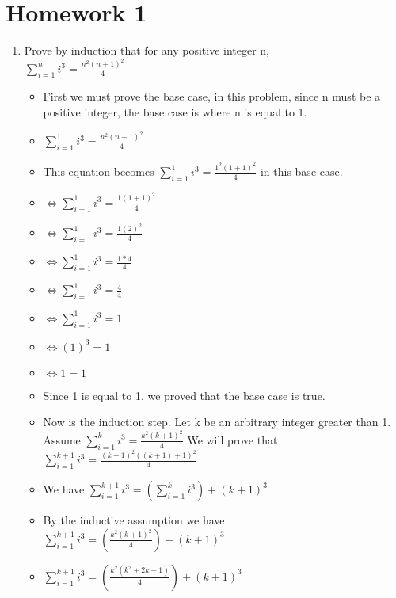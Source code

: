 
\section{Homework 1}
\begin{enumerate}
\item Prove by induction that for any positive integer n, \\
  {\Large $\sum\limits_{i=1}^{n}i^{3}=\frac{n^{2}(n+1)^{2}}{4}$}
    \begin{itemize}
    \item [] First we must prove the base case, in this problem, since n must be a positive integer, the base case is where n is equal to 1.
    \item [] {\Large $\sum\limits_{i=1}^{1}i^{3}=\frac{n^{2}(n+1)^{2}}{4}$}
    \item [] This equation becomes {\Large $\sum\limits_{i=1}^{1}i^{3}=\frac{1^{2}(1+1)^{2}}{4}$} in this base case.
    \item [] {\Large $\Leftrightarrow \sum\limits_{i=1}^{1}i^{3}=\frac{1(1+1)^{2}}{4}$}
    \item [] {\Large $\Leftrightarrow \sum\limits_{i=1}^{1}i^{3}=\frac{1(2)^{2}}{4}$}
    \item [] {\Large $\Leftrightarrow \sum\limits_{i=1}^{1}i^{3}=\frac{1*4}{4}$}
    \item [] {\Large $\Leftrightarrow \sum\limits_{i=1}^{1}i^{3}=\frac{4}{4}$}
    \item [] $\Leftrightarrow \sum\limits_{i=1}^{1}i^{3}=1$
    \item [] $\Leftrightarrow (1)^{3}=1$
    \item [] $\Leftrightarrow 1=1$
    \item Since 1 is equal to 1, we proved that the base case is true.
    \item Now is the induction step. Let k be an arbitrary integer greater than 1. Assume {\Large $\sum\limits_{i=1}^{k}i^{3}=\frac{k^{2}(k+1)^{2}}{4}$} We will prove that {\Large $\sum\limits_{i=1}^{k+1}i^{3}=\frac{(k+1)^{2}((k+1)+1)^{2}}{4}$}
    \item We have {\Large $\sum\limits_{i=1}^{k+1}i^{3}=\left( \sum\limits_{i=1}^{k}i^{3} \right) + (k+1)^{3}$}
    \item By the inductive assumption we have {\Large $\sum\limits_{i=1}^{k+1}i^{3}=\left(\frac{k^{2}(k+1)^{2}}{4} \right) + (k+1)^{3}$}
    \item [] {\Large $\sum\limits_{i=1}^{k+1}i^{3}=\left(\frac{k^{2}(k^{2}+2k+1)}{4} \right) + (k+1)^{3}$}

\end{itemize}
\end{enumerate}
